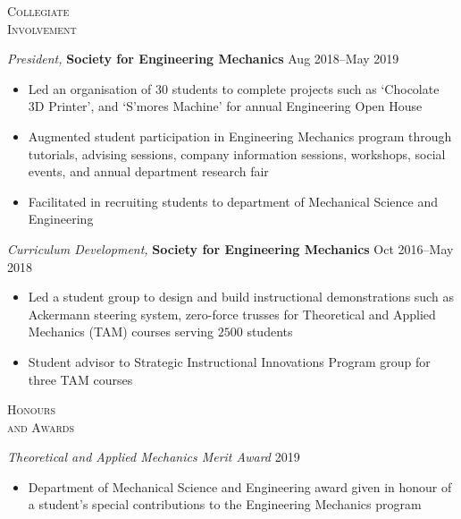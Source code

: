 \documentclass[10pt]{article}
\begin{document}
\begin{multicols}{2}
\textsc{\small Collegiate \\ Involvement}
\columnbreak

{\sl President,} \textbf{Society for Engineering Mechanics} \hfill Aug 2018--May 2019

\vspace{-2.0em}
\begin{itemize}[label=-]
    \setlength\itemsep{-0.25em}
    \item Led an organisation of $30$ students to complete projects such as `Chocolate 3D Printer', and `S'mores Machine' for annual Engineering Open House
    \item Augmented student participation in Engineering Mechanics program through tutorials, advising sessions, company information sessions, workshops, social events, and annual department research fair
    \item Facilitated in recruiting students to department of Mechanical Science and Engineering
\end{itemize}
\vspace{-2.0em}
%
\vspace{0.5em}
%
{\sl Curriculum Development,} \textbf{Society for Engineering Mechanics} \hfill Oct 2016--May 2018

\vspace{-2.0em}
\begin{itemize}[label=-]
    \setlength\itemsep{-0.25em}
    \item Led a student group to design and build instructional demonstrations such as  Ackermann steering system, zero-force trusses for Theoretical and Applied Mechanics (TAM) courses serving $2500$ students
    \item Student advisor to Strategic Instructional Innovations Program group for three TAM courses
\end{itemize}
\vspace{-2.0em}

\end{multicols}
\vspace{-1.5em} 
\begin{multicols}{2}
\textsc{\small Honours \\ and Awards}
\columnbreak

{\sl Theoretical and Applied Mechanics Merit Award} \hfill 2019

\vspace{-2.0em}
\begin{itemize}[label= ]
    \setlength\itemsep{-0.25em}
    \item  Department of Mechanical Science and Engineering award given in honour of a student's special contributions to the Engineering Mechanics program
\end{itemize}
\vspace{-2.0em}


\end{multicols}
\end{document}
